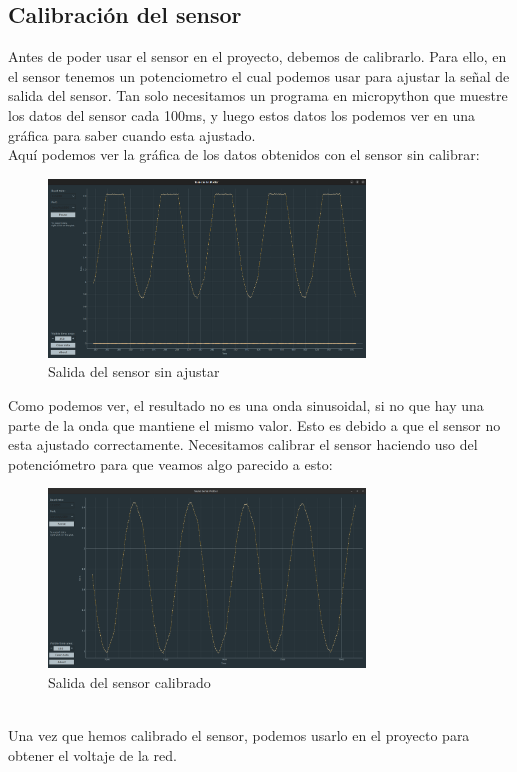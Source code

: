 \begin{titlepage}
\subsection{Calibración del sensor}
Antes de poder usar el sensor en el proyecto, debemos de calibrarlo. Para ello, en el sensor tenemos un potenciometro el cual podemos usar para ajustar la señal de salida del sensor. Tan solo necesitamos un programa en micropython que muestre los datos del sensor cada 100ms, y luego estos datos los podemos ver en una gráfica para saber cuando esta ajustado.\\

Aquí podemos ver la gráfica de los datos obtenidos con el sensor sin calibrar:\\
\newpage
\begin{figure}[h]
	\centering
	\includegraphics[width=0.75\textwidth]{imagenes/sensor_sin_calibrar.png}
	\caption{Salida del sensor sin ajustar}
	\label{fig:circuit}
\end{figure}
Como podemos ver, el resultado no es una onda sinusoidal, si no que hay una parte de la onda que mantiene el mismo valor. Esto es debido a que el sensor no esta ajustado correctamente. Necesitamos calibrar el sensor haciendo uso del potenciómetro para que veamos algo parecido a esto:\\
\begin{figure}[h]
	\centering
	\includegraphics[width=0.75\textwidth]{imagenes/sensor_calibrado.png}
	\caption{Salida del sensor calibrado}
	\label{fig:circuit}
\end{figure}
\\
Una vez que hemos calibrado el sensor, podemos usarlo en el proyecto para obtener el voltaje de la red.\\
\newpage

\end{titlepage}
